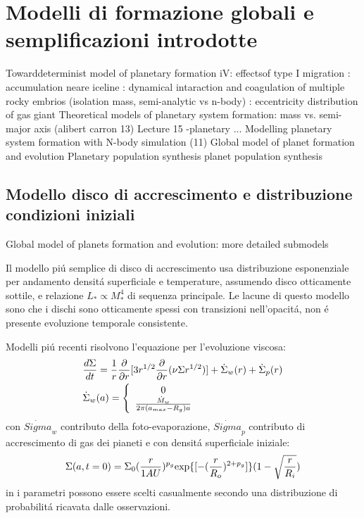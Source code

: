 {\let\clearpage\relax\let\cleardoublepage\relax
\chapter{Modelli di formazione globali e semplificazioni introdotte}
}

\begin{workout}
Towarddeterminist model of planetary formation iV: effectsof type I migration
									: accumulation neare iceline
									: dynamical intaraction and coagulation of multiple rocky embrios (isolation mass, semi-analytic vs n-body)
									: eccentricity distribution of gas giant
Theoretical models of planetary system formation: mass vs. semi-major axis	(alibert carron 13)			Lecture 15 -planetary ...
Modelling planetary system formation with N-body simulation (11)
Global model of planet formation and evolution
Planetary population synthesis
planet population synthesis					
\end{workout}

\section{Modello disco di accrescimento e distribuzione condizioni iniziali}

\begin{workout}
Global model of planets formation and evolution: more detailed submodels
\end{workout}

Il modello pi\'u semplice di disco di accrescimento usa distribuzione esponenziale per andamento densit\'a superficiale e temperature, assumendo disco otticamente sottile, e relazione $L_*\propto M_*^4$ di sequenza principale. Le lacune di questo modello sono che i dischi sono otticamente spessi con transizioni nell'opacit\'a, non \'e presente evoluzione temporale consistente.

Modelli pi\'u recenti  risolvono l'equazione per l'evoluzione viscosa:
\begin{align}
&\frac{d \Sigma}{d t}=\frac{1}{r}\frac{\partial}{\partial r}[3r^{1/2}\frac{\partial}{\partial r}(\nu\Sigma r^{1/2})]+\dot{\Sigma}_w(r)+\dot{\Sigma}_p(r)\label{eq:diskaccrphev-m18}\\
&\dot{\Sigma}_w(a)=\left\{\begin{array}{c}0\\\frac{\dot{M}_w}{2\pi(a_{max}-R_g)a}\\\end{array}\right.
\end{align}
con $\dot{Sigma}_w$ contributo della foto-evaporazione,  $\dot{Sigma}_p$ contributo di accrescimento di gas dei pianeti e con densit\'a superficiale iniziale:
\begin{equation}
\Sigma(a,t=0)=\Sigma_0(\frac{r}{1AU})^{p_g}\text{exp}\{[-(\frac{r}{R_o})^{2+p_g}]\}(1-\sqrt{\frac{r}{R_i}})
\end{equation}
in i parametri possono essere scelti casualmente secondo una distribuzione di probabilit\'a ricavata dalle osservazioni.

